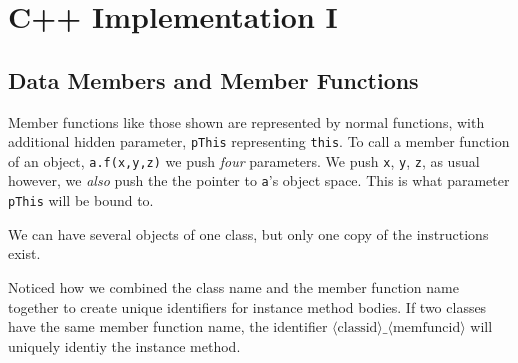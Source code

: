
\chapter{C++ Implementation I}





\section{Data Members and Member Functions}





Member functions like those shown are represented by normal functions, 
with additional hidden parameter, \lstinline{pThis} representing \lstinline{this}. 
To call a member function of an object, \lstinline{a.f(x,y,z)} we push 
\textit{four} parameters. We push \lstinline{x}, \lstinline{y}, \lstinline{z}, 
as usual however, we \textit{also} push the the pointer to \lstinline{a}'s object space. 
This is what parameter \lstinline{pThis} will be bound to.



We can have several objects of one class, but only one copy of the instructions exist.

\begin{figure}[h]
\end{figure} 


Noticed how we combined the class name and the member function name together 
to create unique identifiers for instance method bodies. 
If two classes have the same member function name, the identifier 
$\langle \text{classid} \rangle \_ \langle \text{memfuncid} \rangle$
will uniquely identiy the instance method. 

